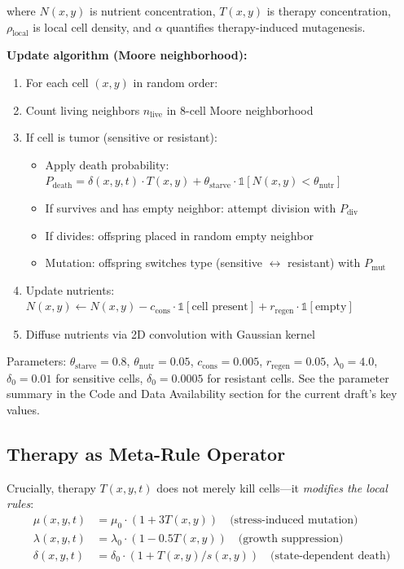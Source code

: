 \documentclass[11pt,a4paper]{article}
\begin{document}
where $N(x,y)$ is nutrient concentration, $T(x,y)$ is therapy concentration, $\rho_{\text{local}}$ is local cell density, and $\alpha$ quantifies therapy-induced mutagenesis.

\textbf{Update algorithm (Moore neighborhood):}
\begin{enumerate}
    \item For each cell $(x,y)$ in random order:
    \item Count living neighbors $n_{\text{live}}$ in 8-cell Moore neighborhood
    \item If cell is tumor (sensitive or resistant):
    \begin{itemize}
        \item Apply death probability: $P_{\text{death}} = \delta(x,y,t) \cdot T(x,y) + \theta_{\text{starve}} \cdot \mathbb{1}[N(x,y) < \theta_{\text{nutr}}]$
        \item If survives and has empty neighbor: attempt division with $P_{\text{div}}$
        \item If divides: offspring placed in random empty neighbor
        \item Mutation: offspring switches type (sensitive $\leftrightarrow$ resistant) with $P_{\text{mut}}$
    \end{itemize}
    \item Update nutrients: $N(x,y) \gets N(x,y) - c_{\text{cons}} \cdot \mathbb{1}[\text{cell present}] + r_{\text{regen}} \cdot \mathbb{1}[\text{empty}]$
    \item Diffuse nutrients via 2D convolution with Gaussian kernel
\end{enumerate}

Parameters: $\theta_{\text{starve}} = 0.8$, $\theta_{\text{nutr}} = 0.05$, $c_{\text{cons}} = 0.005$, $r_{\text{regen}} = 0.05$, $\lambda_0 = 4.0$, $\delta_0 = 0.01$ for sensitive cells, $\delta_0 = 0.0005$ for resistant cells. See the parameter summary in the Code and Data Availability section for the current draft's key values.

\subsection{Therapy as Meta-Rule Operator}

Crucially, therapy $T(x,y,t)$ does not merely kill cells---it \textit{modifies the local rules}:
\begin{align}
    \mu(x,y,t) &= \mu_0 \cdot (1 + 3T(x,y)) \quad \text{(stress-induced mutation)} \\
    \lambda(x,y,t) &= \lambda_0 \cdot (1 - 0.5T(x,y)) \quad \text{(growth suppression)} \\
    \delta(x,y,t) &= \delta_0 \cdot (1 + T(x,y)/s(x,y)) \quad \text{(state-dependent death)}
\end{align}
\end{document}
